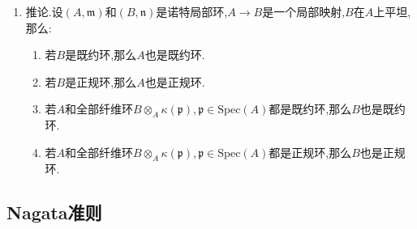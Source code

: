 \begin{enumerate}
\begin{proof}
    	第二条.取$\mathfrak{P}\in\mathrm{Spec}(B)$,记$\mathfrak{p}=\mathfrak{P}\cap A$,如果$\mathrm{ht}(\mathfrak{P})\le i$,那么按照平坦下降定理,有$\mathrm{ht}(\mathfrak{p})\le i$和$\mathrm{ht}(\mathfrak{P}/\mathfrak{p}B)\le i$,于是条件保证了$A_{\mathfrak{p}}$和$B_{\mathfrak{P}}/\mathfrak{p}B_{\mathfrak{P}}$都是正则环,于是$B_{\mathfrak{P}}$是正则局部环.对于$(S_i)$条件,按照本节证明的$\mathrm{depth}(B_{\mathfrak{P}})=\mathrm{depth}(A_{\mathfrak{p}})+\mathrm{depth}(B_{\mathfrak{P}}/\mathfrak{p}B_{\mathfrak{P}})$,说明如果$\mathrm{depth}(B_{\mathfrak{P}})<i$,则$\mathrm{depth}(A_{\mathfrak{p}})$和$\mathrm{depth}(B_{\mathfrak{P}}/\mathfrak{p}B_{\mathfrak{P}})$都小于$i$,于是$A_{\mathfrak{p}}$和$B_{\mathfrak{P}}/\mathfrak{p}B_{\mathfrak{P}}$都是CM环,于是$B_{\mathfrak{P}}$是CM环,得到$B$满足$(S_i)$条件.
    \end{proof}
    \item 推论.设$(A,\mathfrak{m})$和$(B,\mathfrak{n})$是诺特局部环,$A\to B$是一个局部映射,$B$在$A$上平坦,那么:
    \begin{enumerate}
    	\item 若$B$是既约环,那么$A$也是既约环.
    	\item 若$B$是正规环,那么$A$也是正规环.
    	\item 若$A$和全部纤维环$B\otimes_A\kappa(\mathfrak{p}),\mathfrak{p}\in\mathrm{Spec}(A)$都是既约环,那么$B$也是既约环.
    	\item 若$A$和全部纤维环$B\otimes_A\kappa(\mathfrak{p}),\mathfrak{p}\in\mathrm{Spec}(A)$都是正规环,那么$B$也是正规环.
    \end{enumerate}
\end{enumerate}
\newpage
\subsection{Nagata准则}

